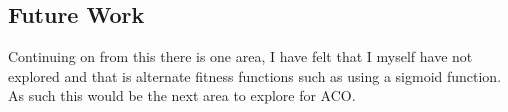 \documentclass[11pt]{article}
\begin{document}
\subsection{Future Work}

Continuing on from this there is one area, I have felt that I myself have not explored and that is alternate fitness functions such as using a sigmoid function. As such this would be the next area to explore for ACO. 


 
\end{document}
